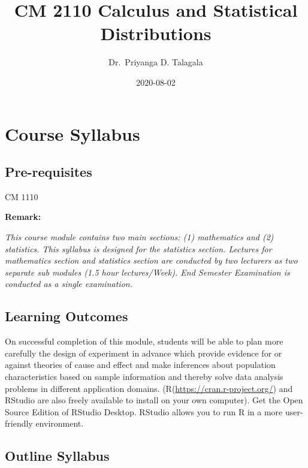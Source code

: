 \documentclass[]{book}
\title{CM 2110 Calculus and Statistical Distributions}
\author{Dr.~Priyanga D. Talagala}
\date{2020-08-02}
\begin{document}
\maketitle

{
\setcounter{tocdepth}{1}
\tableofcontents
}
\hypertarget{course-syllabus}{%
\chapter*{Course Syllabus}\label{course-syllabus}}

\hypertarget{pre-requisites}{%
\section*{Pre-requisites}\label{pre-requisites}}

CM 1110

\textbf{Remark:}

\emph{This course module contains two main sections: (1) mathematics and (2) statistics. This syllabus is designed for the statistics section. Lectures for mathematics section and statistics section are conducted by two lecturers as two separate sub modules (1.5 hour lectures/Week). End Semester Examination is conducted as a single examination.}

\hypertarget{learning-outcomes}{%
\section*{Learning Outcomes}\label{learning-outcomes}}

On successful completion of this module, students will be able to plan more carefully the design of experiment in advance which provide evidence for or against theories of cause and effect and make inferences about population characteristics based on sample information and thereby solve data analysis problems in different application domains. (R(\url{https://cran.r-project.org/}) and RStudio are also freely available to install on your own computer). Get the Open Source Edition of RStudio Desktop. RStudio allows you to run R in a more user-friendly environment.

\hypertarget{outline-syllabus}{%
\section*{Outline Syllabus}\label{outline-syllabus}}
\end{document}
